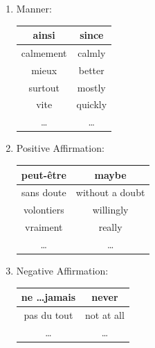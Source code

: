\documentclass{book}
\begin{document}
\begin{enumerate}
            \item Manner:
                \begin{center}
                    \begin{tabular}{|c|c|}
                        \hline
                        ainsi & since \\
                        \hline
                        calmement & calmly \\
                        \hline
                        mieux & better \\
                        \hline
                        surtout & mostly \\
                        \hline
                        vite & quickly \\
                        \hline
                        \dots & \dots \\
                        \hline
                    \end{tabular}
                \end{center}

            \item Positive Affirmation:
                \begin{center}
                    \begin{tabular}{|c|c|}
                        \hline
                        peut-être & maybe \\
                        \hline
                        sans doute & without a doubt \\
                        \hline
                        volontiers & willingly \\
                        \hline
                        vraiment & really \\
                        \hline
                        \dots & \dots \\
                        \hline
                    \end{tabular}
                \end{center}

            \item Negative Affirmation:
                \begin{center}
                    \begin{tabular}{|c|c|}
                        \hline
                        ne \dots jamais & never \\
                        \hline
                        pas du tout & not at all \\
                        \hline
                        \dots & \dots \\
                        \hline
                    \end{tabular}
                \end{center}


\end{enumerate}
\end{document}
